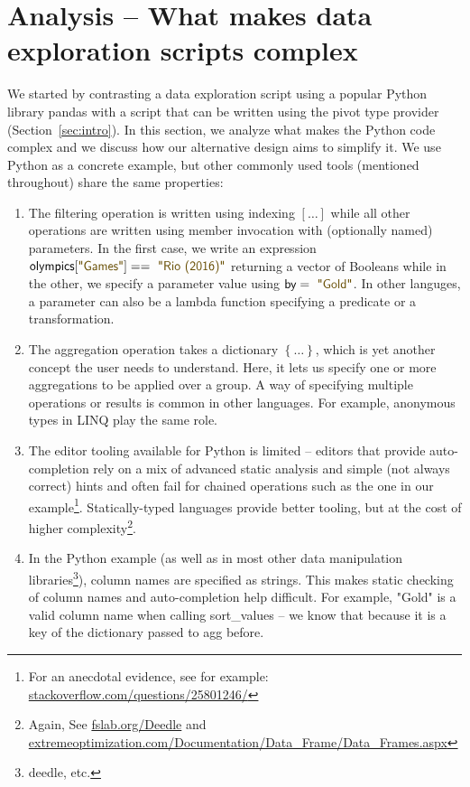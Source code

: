 \documentclass[a4paper,UKenglish]{lipics-v2016}
\newcommand{\str}[1]{\textnormal{\textcolor{strclr}{\sffamily "#1"}}}
\newcommand{\ident}[1]{\textnormal{\sffamily #1}}
\begin{document}

\section{Analysis -- What makes data exploration scripts complex}
\label{sec:analysis}

We started by contrasting a data exploration script using a popular Python library pandas 
with a script that can be written using the pivot type provider (Section~\ref{sec:intro}). In this
section, we analyze what makes the Python code complex and we discuss how our alternative design
aims to simplify it. We use Python as a concrete example, but other commonly used tools (mentioned
throughout) share the same properties:

\begin{enumerate}
\item The filtering operation is written using indexing $[\ldots]$ while all other operations are
  written using member invocation with (optionally named) parameters. In the first case, we write
  an expression $\ident{olympics}[\str{Games}]==\str{Rio (2016)}$ returning a vector of Booleans
  while in the other, we specify a parameter value using $\ident{by}=\str{Gold}$. In other languges,
  a parameter can also be a lambda function specifying a predicate or a transformation.
  
\item The aggregation operation takes a dictionary $\left\{\ldots\right\}$, which is yet another
  concept the user needs to understand. Here, it lets us specify one or more aggregations to
  be applied over a group. A way of specifying multiple operations or results is common in other 
  languages. For example, anonymous types in LINQ play the same role.
      
\item The editor tooling available for Python is limited -- editors that provide auto-completion
  rely on a mix of advanced static analysis and simple (not always correct) hints and often fail
  for chained operations such as the one in our example\footnote{For an anecdotal evidence,
  see for example: \url{stackoverflow.com/questions/25801246/}}. Statically-typed languages
  provide better tooling, but at the cost of higher complexity\footnote{Again,
  See \url{fslab.org/Deedle}
  and \url{extremeoptimization.com/Documentation/Data_Frame/Data_Frames.aspx} }.

\item In the Python example (as well as in most other data manipulation 
  libraries\footnote{deedle, etc.}), column names are specified as strings. This makes static 
  checking of column names and auto-completion help difficult. For example, \str{Gold} is a valid 
  column name when calling \ident{sort\_values} -- we know that because it is a key of the 
  dictionary passed to \ident{agg} before.
\end{enumerate}
\end{document}
